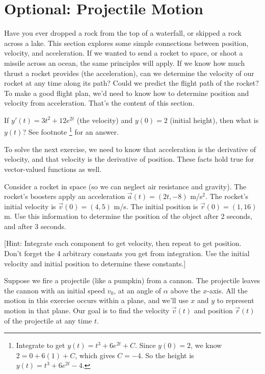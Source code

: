 \clearpage

\section*{Optional: Projectile Motion}

Have you ever dropped a rock from the top of a waterfall, or skipped a rock across a lake. This section explores some simple connections between position, velocity, and acceleration. If we wanted to send a rocket to space, or shoot a missile across an ocean, the same principles will apply. If we know how much thrust a rocket provides (the acceleration), can we determine the velocity of our rocket at any time along its path?  Could we predict the flight path of the rocket? To make a good flight plan, we'd need to know how to determine position and velocity from acceleration.  That's the content of this section.  

\begin{review*}
 If $y'(t) = 3t^2+12e^{2t}$ (the velocity) and $y(0)=2$ (initial height), then what is $y(t)$? See footnote \footnote{Integrate to get $y(t) = t^3+6e^{2t}+C$. Since $y(0)=2$, we know $2=0+6(1)+C$, which gives $C=-4$. So the height is $y(t) = t^3+6e^{2t}-4$. } for an answer. 
\end{review*}


To solve the next exercise, we need to know that acceleration is the derivative of velocity, and that velocity is the derivative of position.  These facts hold true for vector-valued functions as well.


\begin{problem}
Consider a rocket in space (so we can neglect air resistance and gravity). The rocket's boosters apply an acceleration $\vec a(t) = (2t,-8)$ m/s$^2$. The rocket's initial velocity is $\vec v(0) = (4,5)$ m/s.  The initial position is $\vec r(0) = (1,16)$ m. Use this information to determine the position of the object after 2 seconds, and after 3 seconds. 

[Hint: Integrate each component to get velocity, then repeat to get position. Don't forget the 4 arbitrary constants you get from integration. Use the initial velocity and initial position to determine these constants.]
\end{problem}

Suppose we fire a projectile (like a pumpkin) from a cannon. The projectile leaves the cannon with an initial speed $v_0$, at an angle of $\alpha$ above the $x$-axis. All the motion in this exercise occurs within a plane, and we'll use $x$ and $y$ to represent motion in that plane. Our goal is to find the velocity $\vec v(t)$ and position $\vec r(t)$  of the projectile at any time $t$. 

